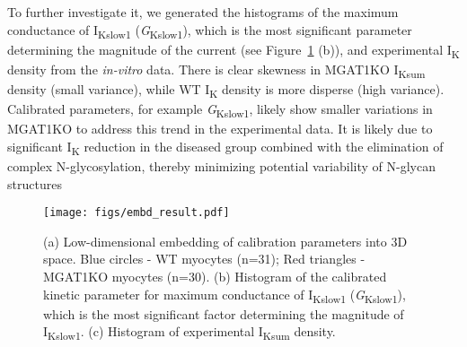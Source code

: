 \documentclass[11pt]{article}
\begin{document}
To further investigate it, we generated the histograms of the maximum conductance of I\textsubscript{Kslow1} (\textit{G}\textsubscript{Kslow1}), which is the most significant parameter determining the magnitude of the current (see Figure~\ref{fig:embd_result} (b)), and experimental I\textsubscript{K} density from the \textit{in-vitro} data. There is clear skewness in MGAT1KO I\textsubscript{Ksum} density (small variance), while WT I\textsubscript{K} density is more disperse (high variance). Calibrated parameters, for example \textit{G}\textsubscript{Kslow1}, likely show smaller variations in MGAT1KO to address this trend in the experimental data. It is likely due to significant I\textsubscript{K} reduction in the diseased group combined with the elimination of complex N-glycosylation, thereby minimizing potential variability of N-glycan structures
\begin{figure}[!ht]
    \centering
    \texttt{[image: figs/embd\_result.pdf]}
    \caption{(a) Low-dimensional embedding of calibration parameters into 3D space. Blue circles - WT myocytes (n=31); Red triangles - MGAT1KO myocytes (n=30). (b) Histogram of the calibrated kinetic parameter for maximum conductance of I\textsubscript{Kslow1} (\textit{G}\textsubscript{Kslow1}), which is the most significant factor determining the magnitude of I\textsubscript{Kslow1}. (c) Histogram of experimental I\textsubscript{Ksum} density.}
    \label{fig:embd_result}
\end{figure}
\end{document}
